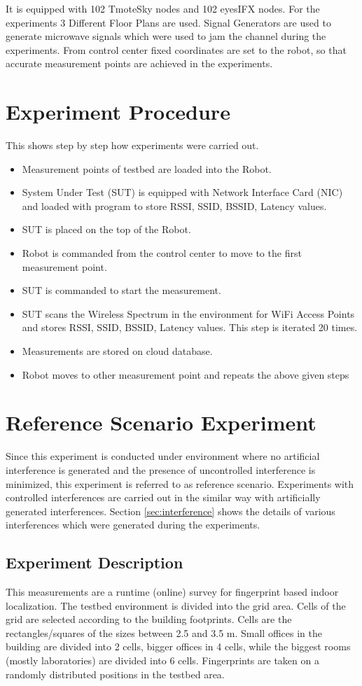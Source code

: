\documentclass[11pt,a4paper,headinclude,footinclude,chapterprefix=on]{scrreprt}
\begin{document}
It is equipped with 102 TmoteSky nodes and 102 eyesIFX nodes. For the experiments 3 Different Floor Plans are used. Signal Generators are used to generate microwave signals which were used to jam the channel during the experiments. From control center fixed coordinates are set to the robot, so that accurate measurement points are achieved in the experiments. 

\section{Experiment Procedure} This shows step by step how experiments were carried out. 
\begin{itemize}
	\item Measurement points of testbed are loaded into the Robot. 
	\item System Under Test (SUT) is equipped with Network Interface Card (NIC) and loaded with program to store RSSI, SSID, BSSID, Latency values. 
	\item SUT is placed on the top of the Robot. 
	\item Robot is commanded from the control center to move to the first measurement point. 
	\item SUT is commanded to start the measurement. 
	\item SUT scans the Wireless Spectrum in the environment for WiFi Access Points and stores RSSI, SSID, BSSID, Latency values. This step is iterated 20 times. 
	\item Measurements are stored on cloud database. 
	\item Robot moves to other measurement point and repeats the above given steps 
\end{itemize}

\section{Reference Scenario Experiment} Since this experiment is conducted under environment where no artificial interference is generated and the presence of uncontrolled interference is minimized, this experiment is referred to as reference scenario. Experiments with controlled interferences are carried out in the similar way with artificially generated interferences. Section \ref{sec:interference} shows the details of various interferences which were generated during the experiments.

\subsection{Experiment Description} This measurements are a runtime (online) survey for fingerprint based indoor localization. The testbed environment is divided into the grid area. Cells of the grid are selected according to the building footprints. Cells are the rectangles/squares of the sizes between 2.5 and 3.5 m. Small offices in the building are divided into 2 cells, bigger offices in 4 cells, while the biggest rooms (mostly laboratories) are divided into 6 cells. Fingerprints are taken on a randomly distributed positions in the testbed area.
\end{document}
